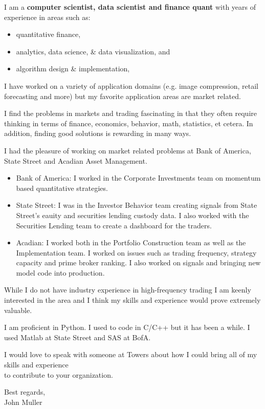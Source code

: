 \documentclass{letter}
\begin{document}
\noindent
I am a \textbf {computer scientist, data scientist and finance quant} with years of experience 
in areas such as:
\vspace{-.1in}
\begin{itemize}[noitemsep]
 \item quantitative finance, 
 \item analytics, data science, \& data visualization, and
 \item algorithm design \& implementation,
\end{itemize}

\noindent I have worked on a variety of application domains 
(e.g. image compression, retail forecasting and more)
but my favorite application areas are market related.

\noindent I find the problems in markets and trading fascinating in that they often require thinking in terms of finance, economics, behavior, math, statistics, et cetera.
In addition, finding good solutions is rewarding in many ways.


\noindent
I had the pleasure of working on market related 
problems at Bank of America, State Street and Acadian Asset Management.
\begin{itemize}
\item Bank of America: I worked in the Corporate Investments team on momentum based quantitative strategies.

\item State Street: I was in the Investor Behavior team 
 creating signals from State Street's eauity and securities lending custody data.
 I also worked with the Securities Lending team to create a dashboard for the traders.
 
\item Acadian: I worked both in the Portfolio Construction team as well as the Implementation team. I worked on issues such as trading frequency, strategy capacity and prime broker ranking. I also worked on signals and bringing new model code into production.
 \end{itemize}
 

\noindent
While I do not have industry experience in high-frequency trading I am keenly interested in the area and I think my skills and experience would prove extremely valuable.

\noindent
I am proficient in Python.  I used to code in C/C++ but it has been a while.  I used Matlab at State Street and SAS at BofA.

\noindent
I would love to speak with someone at Towers about how I could bring all of my skills and experience \\
to contribute to your organization.

\vspace*{0.2in}
\noindent Best regards,\\
John Muller
\end{document}
